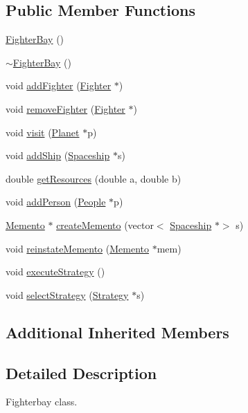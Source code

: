 \subsection*{Public Member Functions}
\begin{DoxyCompactItemize}
\item 
\hyperlink{classFighterBay_a7a2ab5524457936b01bbf98cd717ac91}{Fighter\+Bay} ()
\item 
\hyperlink{classFighterBay_aa037d013b598d478aa4314c16081cfc1}{$\sim$\+Fighter\+Bay} ()
\item 
void \hyperlink{classFighterBay_a24764deae3987f30be8825c7673b90a0}{add\+Fighter} (\hyperlink{classFighter}{Fighter} $\ast$)
\item 
void \hyperlink{classFighterBay_ab504d923d2e3837c29c56453bd1f7ba1}{remove\+Fighter} (\hyperlink{classFighter}{Fighter} $\ast$)
\item 
void \hyperlink{classFighterBay_ac0a0c1629ee0b28ade380e88774bbad4}{visit} (\hyperlink{classPlanet}{Planet} $\ast$p)
\item 
void \hyperlink{classFighterBay_a8975b88b27663c76f82168752593ceda}{add\+Ship} (\hyperlink{classSpaceship}{Spaceship} $\ast$s)
\item 
double \hyperlink{classFighterBay_ae6071df768f59aeeab67f7b2bb1cce52}{get\+Resources} (double a, double b)
\item 
void \hyperlink{classFighterBay_aa0777fe7c8a3e6b772fc8bf58a3cb9bb}{add\+Person} (\hyperlink{classPeople}{People} $\ast$p)
\item 
\hyperlink{classMemento}{Memento} $\ast$ \hyperlink{classFighterBay_a925de99777e92d00e51e8aba09d5135c}{create\+Memento} (vector$<$ \hyperlink{classSpaceship}{Spaceship} $\ast$$>$ s)
\item 
void \hyperlink{classFighterBay_ab7971eefc44f85b00424014916616fb6}{reinstate\+Memento} (\hyperlink{classMemento}{Memento} $\ast$mem)
\item 
void \hyperlink{classFighterBay_ae450be19e2e5233e36031db1f7b17503}{execute\+Strategy} ()
\item 
void \hyperlink{classFighterBay_a32655a70f39312f94403d9aada55788b}{select\+Strategy} (\hyperlink{classStrategy}{Strategy} $\ast$s)
\end{DoxyCompactItemize}
\subsection*{Additional Inherited Members}


\subsection{Detailed Description}
Fighterbay class. 

